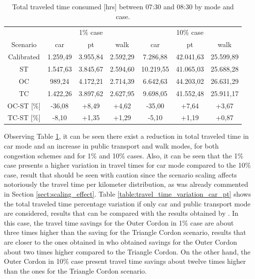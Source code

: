 \documentclass[Journal,letterpaper]{ascelike-new}
\begin{document}
\begin{table}[h!]
	\centering
	\caption{Total traveled time consumed [hrs] between 07:30 and 08:30 by mode and case.}
	\label{table:travel_time_variation}
	\begin{tabular}{c|ccc|ccc}
		\cline{1-7}
				    & \multicolumn{3}{c|}{1\% case} & \multicolumn{3}{c}{10\% case} \\
		Scenario	& car    & pt    & walk  & car     & pt    & walk   \\ 
		\cline{1-7}
		Calibrated	& 1.259,49 	& 3.955,84	& 2.592,29	& 7.286,88	& 42.041,63 & 25.599,89  \\
		ST		 	& 1.547,63 	& 3.845,67	& 2.594,60	& 10.219,55	& 41.065,03 & 25.688,28  \\
		OC		 	& 989,24 	& 4.172,21 	& 2.714,39	& 6.642,63	& 44.203,02 & 26.631,29  \\
		TC		 	& 1.422,26 	& 3.897,62	& 2.627,95	& 9.698,05	& 41.552,48 & 25.911,17  \\
		\hline
		OC-ST [\%] 	& -36,08 & +8,49 & +4,62 & -35,00 & +7,64 & +3,67 \\		
		TC-ST [\%] 	& -8,10  & +1,35 & +1,29 & -5,10  & +1,19 & +0,87 \\					
		\cline{1-7} 
	\end{tabular}
\end{table}
Observing Table \ref{table:travel_time_variation}, it can be seen there exist a reduction in total traveled time in car mode and an increase in public transport and walk modes, for both congestion schemes and for 1\% and 10\% cases. Also, it can be seen that the 1\% case presents a higher variation in travel times for car mode compared to the 10\% case, result that should be seen with caution since the scenario scaling affects notoriously the travel time per kilometer distribution, as was already commented in Section \ref{sect:scaling_effect}. Table \ref{table:travel_time_variation_car_pt} shows the total traveled time percentage variation if only car and public transport mode are considered, results that can be compared with the results obtained by \cite{gleave2009tarificacion}. In this case, the travel time savings for the Outer Cordon in 1\% case are about three times higher than the saving for the Triangle Cordon scenario, results that are closer to the ones obtained in \cite{gleave2009tarificacion} who obtained savings for the Outer Cordon about two times higher compared to the Triangle Cordon. On the other hand, the Outer Cordon in 10\% case present travel time savings about twelve times higher than the ones for the Triangle Cordon scenario. 
\end{document}

